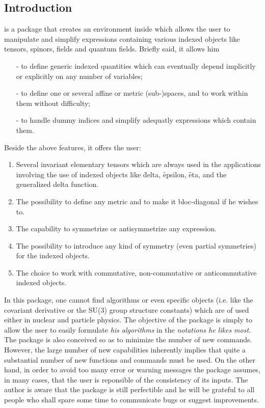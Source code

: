 

\subsection{Introduction}
 is a package that creates an environment
inside {\REDUCE}
which  allows the user to
manipulate and simplify expressions containing various indexed objects
like tensors, spinors, fields and quantum fields.
Briefly said, it allows him
\begin{itemize}
\item[-] to define generic indexed quantities which can eventually depend
implicitly or explicitly on any number of variables;
\item[-] to define one or several affine or metric (sub-)spaces, and to work
within them without difficulty;
\item[-] to handle dummy indices and simplify adequatly expressions
which contain them.
\end{itemize}
Beside the above features, it offers the user:
\begin{enumerate}
\item  Several invariant
elementary tensors  which are always used in the applications involving
the use of indexed objects like \f{delta}, \f{epsilon}, \f{eta}, and the
generalized delta function.
\item The possibility to define any metric and to make it bloc-diagonal
if he wishes to.
\item The capability to symmetrize or antisymmetrize any expression.
\item The possibility to introduce any kind of symmetry (even partial symmetries)
for the indexed objects.
\item The choice to work with commutative, non-commutative or anticommutative
indexed objects.
\end{enumerate}
In this package, one cannot find  algorithms or even specific objects
(i.e. like the covariant derivative or the SU(3) group structure constants)
which are of
used either in nuclear and particle physics.
The objective of the package is simply to allow
the user to easily formulate \emph{his algorithms} in the \emph{notations he likes
most}.
The package is also conceived so as to minimize the number of new commands.
However, the large number of new capabilities inherently implies that quite
a substantial number of new functions and commands must be used. On the other
hand, in order to avoid too many error  or warning messages the package
assumes, in many cases, that the user is reponsible of the consistency of its
inputs.
The author is aware that the package is still perfectible and
he will be grateful to all people who shall spare some time to communicate
bugs or suggest improvements.


